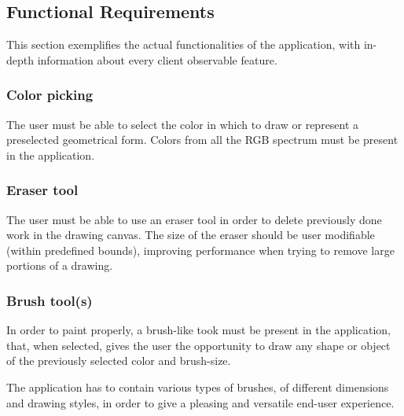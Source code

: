 \documentclass[12pt]{article}
\begin{document}
\subsection{Functional Requirements}
This section exemplifies the actual functionalities of the application, with in-depth information about every client observable feature.
\subsubsection{Color picking}
The user must be able to select the color in which to draw or represent a preselected geometrical form. Colors from all the RGB spectrum must be present in the application.
\subsubsection{Eraser tool}
The user must be able to use an eraser tool in order to delete previously done work in the drawing canvas. The size of the eraser should be user modifiable (within predefined bounds), improving performance when trying to remove large portions of a drawing.
\subsubsection{Brush tool(s)}
In order to paint properly, a brush-like took must be present in the application, that, when selected, gives the user the opportunity to draw any shape or object of the previously selected color and brush-size.

The application has to contain various types of brushes, of different dimensions and drawing styles, in order to give a pleasing and versatile end-user experience.
\end{document}
